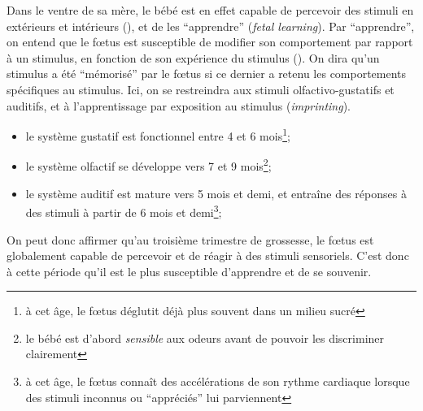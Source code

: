\documentclass[french]{article}
\begin{document}
				Dans le ventre de sa mère, le bébé est en effet capable de percevoir des stimuli en extérieurs et intérieurs (\cite{busnel2010}), et de les ``apprendre'' (\textit{fetal learning}). Par ``apprendre'', on entend que le fœtus est susceptible de modifier son comportement par rapport à un stimulus, en fonction de son expérience du stimulus (\cite{james2010}). On dira qu'un stimulus a été ``mémorisé'' par le fœtus si ce dernier a retenu  les comportements spécifiques au stimulus.  Ici, on se restreindra aux stimuli olfactivo-gustatifs et auditifs, et à l'apprentissage par exposition au stimulus (\textit{imprinting}).
				\begin{itemize}
					\item le système gustatif est fonctionnel entre 4 et 6 mois\footnote{à cet âge, le fœtus déglutit déjà plus souvent dans un milieu sucré};
					\item le système olfactif se développe vers 7 et 9 mois\footnote{le bébé est d'abord \textit{sensible} aux odeurs avant de pouvoir les discriminer clairement};
					\item le système auditif est mature vers 5 mois et demi, et entraîne des réponses à des stimuli à partir de 6 mois et demi\footnote{à cet âge, le fœtus connaît des accélérations de son rythme cardiaque lorsque des stimuli inconnus ou ``appréciés'' lui parviennent};
				\end{itemize}
				On peut donc affirmer qu'au troisième trimestre de grossesse, le fœtus est globalement capable de percevoir et de réagir à des stimuli sensoriels. C'est donc à cette période qu'il est le plus susceptible d'apprendre et de se souvenir.
			
\end{document}
